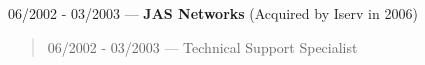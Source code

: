 06/2002 - 03/2003 --- {\bf JAS Networks} (Acquired by Iserv in 2006)
\begin{quote}
06/2002 - 03/2003 --- Technical Support Specialist
\end{quote}
